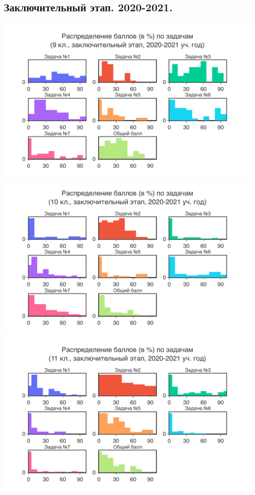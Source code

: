 \subsection{Заключительный этап. 2020-2021.}

\includegraphics[width=\linewidth]{../export/pdf/results/2021/respa/grade9-dist-problemwise.pdf}
\includegraphics[width=\linewidth]{../export/pdf/results/2021/respa/grade10-dist-problemwise.pdf}
\includegraphics[width=\linewidth]{../export/pdf/results/2021/respa/grade11-dist-problemwise.pdf}


